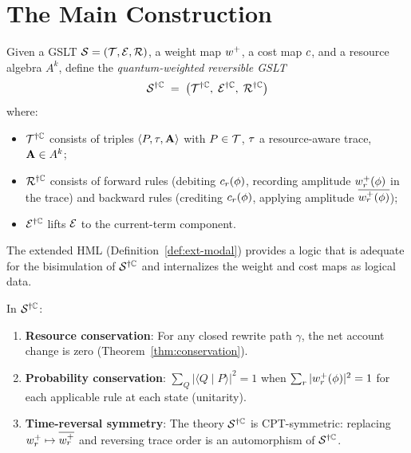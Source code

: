 \section{The Main Construction}

\begin{construction}
\label{con:main}
Given a GSLT $\mathcal{S} = (\mathcal{T}, \mathcal{E}, \mathcal{R})$, a weight map $w^{+}$,
a cost map $c$, and a resource algebra $A^k$, define the
\emph{quantum-weighted reversible GSLT}
\[
  \mathcal{S}^{\dagger\mathbb{C}} \;=\;
  \bigl(\mathcal{T}^{\dagger\mathbb{C}},\;\mathcal{E}^{\dagger\mathbb{C}},\;\mathcal{R}^{\dagger\mathbb{C}}\bigr)
\]
where:
\begin{itemize}[itemsep=2pt]
  \item $\mathcal{T}^{\dagger\mathbb{C}}$ consists of triples $\langle P, \tau, \mathbf{A}\rangle$
        with $P \in \mathcal{T}$, $\tau$ a resource-aware trace, $\mathbf{A} \in A^k$;
  \item $\mathcal{R}^{\dagger\mathbb{C}}$ consists of forward rules (debiting $c_r(\phi)$,
        recording amplitude $w^{+}_r(\phi)$ in the trace) and backward rules
        (crediting $c_r(\phi)$, applying amplitude $\overline{w^{+}_r(\phi)}$);
  \item $\mathcal{E}^{\dagger\mathbb{C}}$ lifts $\mathcal{E}$ to the current-term component.
\end{itemize}
The extended HML (Definition~\ref{def:ext-modal}) provides a logic that
is adequate for the bisimulation of $\mathcal{S}^{\dagger\mathbb{C}}$ and internalizes
the weight and cost maps as logical data.
\end{construction}

\begin{theorem}
In $\mathcal{S}^{\dagger\mathbb{C}}$:
\begin{enumerate}[label=(\roman*)]
  \item \textbf{Resource conservation}: For any closed rewrite path $\gamma$,
        the net account change is zero (Theorem~\ref{thm:conservation}).
  \item \textbf{Probability conservation}: $\sum_Q |\langle Q \mid P \rangle|^2 = 1$
        when $\sum_r |w^{+}_r(\phi)|^2 = 1$ for each applicable rule at each
        state (unitarity).
  \item \textbf{Time-reversal symmetry}: The theory $\mathcal{S}^{\dagger\mathbb{C}}$ is
        CPT-symmetric: replacing $w^{+}_r \mapsto \overline{w^{+}_r}$ and
        reversing trace order is an automorphism of $\mathcal{S}^{\dagger\mathbb{C}}$.
\end{enumerate}
\end{theorem}

